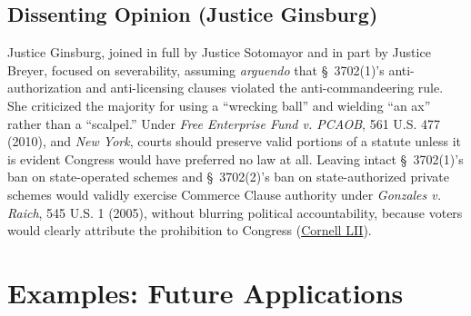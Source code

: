 \documentclass[12pt]{article}
\begin{document}
\subsection{Dissenting Opinion (Justice Ginsburg)}

Justice Ginsburg, joined in full by Justice Sotomayor and in part by Justice Breyer, focused on severability, assuming \textit{arguendo} that \S~3702(1)'s anti-authorization and anti-licensing clauses violated the anti-commandeering rule. She criticized the majority for using a ``wrecking ball'' and wielding ``an ax'' rather than a ``scalpel.'' Under \textit{Free Enterprise Fund v. PCAOB}, 561 U.S. 477 (2010), and \textit{New York}, courts should preserve valid portions of a statute unless it is evident Congress would have preferred no law at all. Leaving intact \S~3702(1)'s ban on state-operated schemes and \S~3702(2)'s ban on state-authorized private schemes would validly exercise Commerce Clause authority under \textit{Gonzales v. Raich}, 545 U.S. 1 (2005), without blurring political accountability, because voters would clearly attribute the prohibition to Congress (\href{https://www.law.cornell.edu/supremecourt/text/16-476}{Cornell LII}).

\section{Examples: Future Applications}
\end{document}
